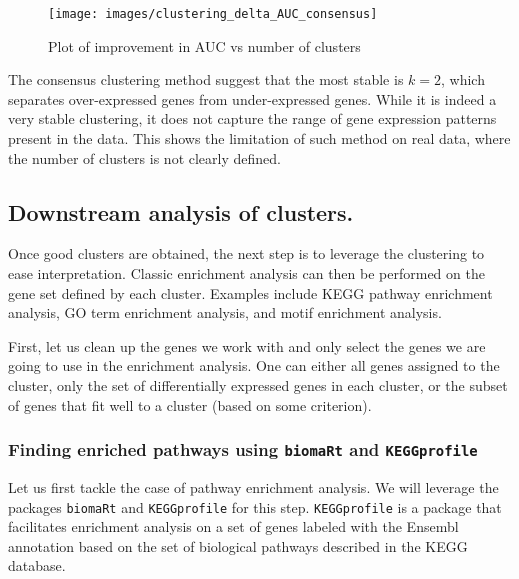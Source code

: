 \documentclass[9pt,a4paper,]{extarticle}
\begin{document}
\begin{figure}[H]

{\centering \texttt{[image: images/clustering\_delta\_AUC\_consensus]} 

}

\caption{Plot of improvement in AUC vs number of clusters}\label{fig:plotDeltaAUC}
\end{figure}

The consensus clustering method suggest that the most stable is \(k=2\), which
separates over-expressed genes from under-expressed genes. While it is indeed
a very stable clustering, it does not capture the range of gene expression
patterns present in the data. This shows the limitation of such method on real
data, where the number of clusters is not clearly defined.

\hypertarget{downstream-analysis-of-clusters.}{%
\subsection{Downstream analysis of clusters.}\label{downstream-analysis-of-clusters.}}

Once good clusters are obtained, the next step is to leverage the clustering
to ease interpretation. Classic enrichment analysis can then be performed
on the gene set defined by each cluster. Examples include KEGG pathway enrichment analysis,
GO term enrichment analysis, and motif enrichment analysis.

First, let us clean up the genes we work with and only select the genes we are
going to use in the enrichment analysis. One can either all genes assigned to
the cluster, only the set of differentially expressed genes in each cluster,
or the subset of genes that fit well to a cluster (based on some criterion).

\hypertarget{finding-enriched-pathways-using-biomart-and-keggprofile}{%
\subsubsection{\texorpdfstring{Finding enriched pathways using \texttt{biomaRt} and \texttt{KEGGprofile}}{Finding enriched pathways using biomaRt and KEGGprofile}}\label{finding-enriched-pathways-using-biomart-and-keggprofile}}

Let us first tackle the case of pathway enrichment analysis. We will leverage
the packages \texttt{biomaRt} \citep{durinck:biomart} and \texttt{KEGGprofile}
\citep{zhao:keggprofile} for this step. \texttt{KEGGprofile} is a package that facilitates
enrichment analysis on a set of genes labeled with the Ensembl annotation
\citep{ensembl2020} based on the set of biological pathways described in the KEGG
database\citep{KEGG}.
\end{document}
